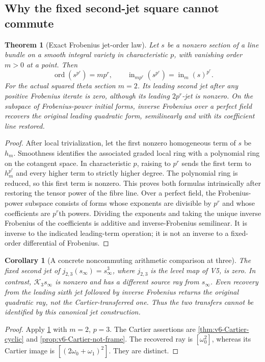 \documentclass[11pt]{article}
\newtheorem{theorem}{Theorem}[section]
\newtheorem{corollary}[corollary]{Corollary}
\theoremstyle{definition}
\theoremstyle{remark}
\begin{document}
\subsection{Why the fixed second-jet square cannot commute}
\begin{theorem}[Exact Frobenius jet-order law]
\label{thm:v6-jet-Frobenius}
Let $s$ be a nonzero section of a line bundle on a smooth integral variety
in characteristic $p$, with vanishing order $m>0$ at a point. Then
\begin{equation}
 \boxed{\operatorname{ord}(s^{p^r})=mp^r,\qquad
 \operatorname{in}_{mp^r}(s^{p^r})=
             \operatorname{in}_m(s)^{p^r}.}
 \label{eq:v6-jet-order}
\end{equation}
For the actual squared theta section $m=2$. Its leading second jet after
any positive Frobenius iterate is zero, although its leading
$2p^r$-jet is nonzero. On the subspace of Frobenius-power initial forms,
inverse Frobenius over a perfect field recovers the original leading
quadratic form, semilinearly and with its coefficient line restored.
\end{theorem}
\begin{proof}
After local trivialization, let the first nonzero homogeneous term of
$s$ be $h_m$. Smoothness identifies the associated graded local ring
with a polynomial ring on the cotangent space. In characteristic $p$,
raising to $p^r$ sends the first term to $h_m^{p^r}$ and every higher
term to strictly higher degree. The polynomial ring is reduced, so this
first term is nonzero. This proves both formulas intrinsically after
restoring the tensor power of the fibre line.
Over a perfect field, the Frobenius-power subspace consists of forms
whose exponents are divisible by $p^r$ and whose coefficients are
$p^r$th powers. Dividing the exponents and taking the unique inverse
Frobenius of the coefficients is additive and inverse-Frobenius
semilinear. It is inverse to the indicated leading-term operation;
it is not an inverse to a fixed-order differential of Frobenius.
\end{proof}

\begin{corollary}[A concrete noncommuting arithmetic comparison at three]
\label{cor:v6-noncommuting}
The fixed second jet of $j_{2,3}(s_\infty)=s_\infty^3$, where
$j_{2,3}$ is the \emph{level map} of V5, is zero. In contrast,
$\mathcal K_3s_\infty$ is nonzero and has a different source ray from
$s_\infty$. Even recovery from the leading sixth jet followed by
inverse Frobenius returns the original quadratic ray, not the
Cartier-transferred one. Thus the two transfers cannot be identified by
this canonical jet construction.
\end{corollary}
\begin{proof}
Apply \cref{thm:v6-jet-Frobenius} with $m=2$, $p=3$.
The Cartier assertions are \cref{thm:v6-Cartier-cyclic} and
\cref{prop:v6-Cartier-not-frame}. The recovered ray is
$[\omega_0^2]$, whereas its Cartier image is
$[(2\omega_0+\omega_1)^2]$. They are distinct.
\end{proof}
\end{document}
